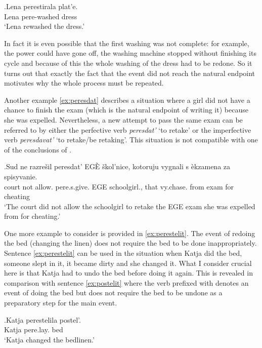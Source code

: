\exg.\label{ex:perestirat}Lena perestirala plat'e.\\
Lena pere-washed dress\\
\trans `Lena rewashed the dress.'

In fact it is even possible that the first washing was not complete: for example, the power could have gone off, the washing machine stopped without finishing its cycle and because of this the whole washing of the dress had to be redone. So it turns out that exactly the fact that the event did not reach the natural endpoint motivates why the whole process must be repeated.

Another example \ref{ex:peresdat} describes a situation where a girl did not have a chance to finish the exam (which is the natural endpoint of writing it) because she was expelled. Nevertheless, a new attempt to pass the same exam can be referred to by either the perfective verb \textit{peresdat'} `to retake' or the imperfective verb \textit{peresdavat'} `to retake/be retaking'. This situation is not compatible with one of the conclusions of \citet{Kagan:book}.

\exg.\label{ex:peresdat}Sud ne razre\v{s}il peresdat' EG\`{E} \v{s}kol'nice, kotoruju vygnali s \`{e}kzamena za spisyvanie.\\
court not allow. pere.s.give. EGE schoolgirl., that vy.chase. from exam for cheating\\
\trans `The court did not allow the schoolgirl to retake the EGE exam she was expelled from for cheating.'

One more example to consider is provided in \ref{ex:perestelit}. The event of redoing the bed (changing the linen) does not require the bed to be done inappropriately. Sentence \ref{ex:perestelit} can be used in the situation when Katja did the bed, someone slept in it, it became dirty and she changed it. What I consider crucial here is that Katja had to undo the bed before doing it again. This is revealed in comparison with sentence \ref{ex:postelit} where the verb prefixed with  denotes an event of doing the bed but does not require the bed to be undone as a preparatory step for the main event. 

\exg.\label{ex:perestelit}Katja perestelila postel'.\\
Katja pere.lay. bed\\
\trans `Katja changed the bedlinen.'

